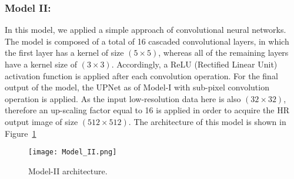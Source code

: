 \subsubsection{Model II:}
In this model, we applied a simple approach of convolutional neural 
networks.
The model is composed of a total of 16 cascaded convolutional layers, in which 
the first layer has a kernel of size \((5\times 5)\), whereas all of the 
remaining layers have a kernel size of \((3\times 3)\).
Accordingly, a ReLU (Rectified Linear Unit) activation function is applied 
after each convolution operation. 
For the final output of the model, the UPNet as of Model-I with sub-pixel 
convolution operation is applied.
As the input low-resolution data here is also \((32\times 32)\), therefore an 
up-scaling factor equal to 16 is applied in order to acquire the HR output 
image of size \((512\times 512)\).
The architecture of this model is shown in Figure~\ref{fig:Model_II}
\begin{figure} [h!]
	\begin{center}
		\texttt{[image: Model\_II.png]}
	\end{center}
	\caption{Model-II architecture.} 
	\label{fig:Model_II}
\end{figure}
